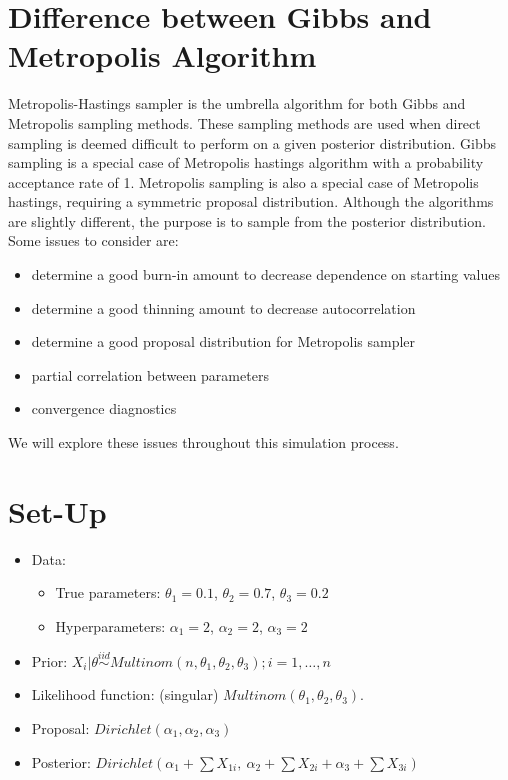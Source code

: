 \documentclass[11pt,a4paper]{article}
\begin{document}
\section*{Difference between Gibbs and Metropolis Algorithm}
Metropolis-Hastings sampler is the umbrella algorithm for both Gibbs and Metropolis sampling methods. These sampling methods are used when direct sampling is deemed difficult to perform on a given posterior distribution. Gibbs sampling is a special case of Metropolis hastings algorithm with a probability acceptance rate of 1. Metropolis sampling is also a special case of Metropolis hastings, requiring a symmetric proposal distribution. Although the algorithms are slightly different, the purpose is to sample from the posterior distribution. 
\newline
Some issues to consider are: 
 
\begin{itemize}
 \item determine a good burn-in amount to decrease dependence on starting values  
 \item determine a good thinning amount to decrease autocorrelation
 \item determine a good proposal distribution for Metropolis sampler
 \item partial correlation between parameters
 \item convergence diagnostics
\end{itemize}
 
We will explore these issues throughout this simulation process.	


\section*{Set-Up}
\begin{itemize}
	\item Data: 
	\begin{itemize}
		\item True parameters: $\theta_{1} = 0.1$, $\theta_{2} = 0.7$, $\theta_{3} = 0.2$
		\item Hyperparameters: $\alpha_{1} = 2$, $\alpha_{2} = 2$, $\alpha_{3} = 2$ 
	\end{itemize}
	\item Prior: $X_{i} | \theta \overset{iid}{\sim} Multinom(n, \theta_{1}, \theta_{2}, \theta_{3}); i = 1, \dots, n$
	\item Likelihood function: (singular) $Multinom(\theta_{1},\theta_{2},\theta_{3})$.
	\item Proposal: $Dirichlet(\alpha_{1}, \alpha_{2}, \alpha_{3})$
	\item Posterior: $Dirichlet(\alpha_{1}+\sum{X_{1i}}, \ \alpha_{2}+\sum{X_{2i}} + \alpha_{3}+\sum{X_{3i}})$
\end{itemize}
\end{document}
